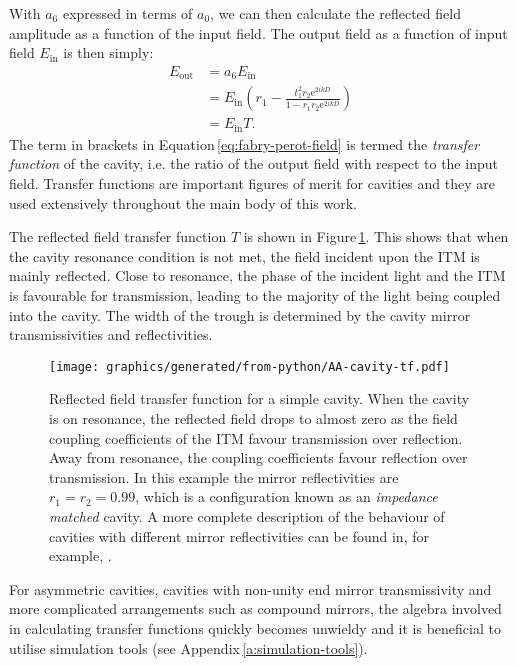 With $a_6$ expressed in terms of $a_0$, we can then calculate the reflected field amplitude as a function of the input field. The output field as a function of input field $E_{\text{in}}$ is then simply:
\begin{equation}
  \label{eq:fabry-perot-field}
  \begin{split}
    E_{\text{out}} &= a_6 E_{\text{in}} \\
                   &= E_{\text{in}} \left( r_1 - \frac{t_1^2 r_2 \text{e}^{2ikD}}{1 - r_1 r_2 \text{e}^{2ikD}} \right) \\
                   &= E_{\text{in}} T.
  \end{split}
\end{equation}
The term in brackets in Equation\,\ref{eq:fabry-perot-field} is termed the \emph{transfer function} of the cavity, i.e. the ratio of the output field with respect to the input field. Transfer functions are important figures of merit for cavities and they are used extensively throughout the main body of this work.

The reflected field transfer function $T$ is shown in Figure\,\ref{fig:cavity-tf}. This shows that when the cavity resonance condition is not met, the field incident upon the \gls{ITM} is mainly reflected. Close to resonance, the phase of the incident light and the \gls{ITM} is favourable for transmission, leading to the majority of the light being coupled into the cavity. The width of the trough is determined by the cavity mirror transmissivities and reflectivities.

\begin{figure}
  \centering
  \texttt{[image: graphics/generated/from-python/AA-cavity-tf.pdf]}
  \caption[Reflected field transfer function for a simple \FP{} cavity]{\label{fig:cavity-tf}Reflected field transfer function for a simple \FP{} cavity. When the cavity is on resonance, the reflected field drops to almost zero as the field coupling coefficients of the ITM favour transmission over reflection. Away from resonance, the coupling coefficients favour reflection over transmission. In this example the mirror reflectivities are $r_1 = r_2 = 0.99$, which is a configuration known as an \emph{impedance matched} cavity. A more complete description of the behaviour of cavities with different mirror reflectivities can be found in, for example, \cite{Freise2010}.}
\end{figure}

For asymmetric cavities, cavities with non-unity end mirror transmissivity and more complicated arrangements such as compound mirrors, the algebra involved in calculating transfer functions quickly becomes unwieldy and it is beneficial to utilise simulation tools (see Appendix\,\ref{a:simulation-tools}).


